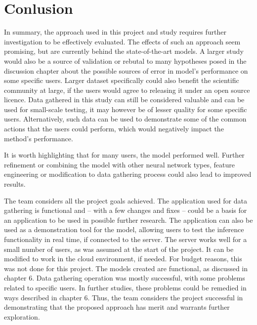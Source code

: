 
\chapter{Conlusion}

In summary, the approach used in this project and study requires further investigation to be effectively evaluated. The effects of such an approach seem promising, but are currently behind the state-of-the-art models. A larger study would also be a source of validation or rebutal to many hypotheses posed in the discussion chapter about the possible sources of error in model's performance on some specific users. Larger dataset specifically could also benefit the scientific community at large, if the users would agree to releasing it under an open source licence. Data gathered in this study can still be considered valuable and can be used for small-scale testing, it may however be of lesser quality for some specific users. Alternatively, such data can be used to demonstrate some of the common actions that the users could perform, which would negatively impact the method's performance.

It is worth highlighting that for many users, the model performed well. Further refinement or combining the model with other neural network types, feature engineering or modification to data gathering process could also lead to improved results.

The team considers all the project goals achieved. The application used for data gathering is functional and -- with a few changes and fixes -- could be a basis for an application to be used in possible further research. The application can also be used as a demonstration tool for the model, allowing users to test the inference functionality in real time, if connected to the server. The server works well for a small number of users, as was assumed at the start of the project. It can be modified to work in the cloud environment, if needed. For budget reasons, this was not done for this project. The models created are functional, as discussed in chapter 6. Data gathering operation was mostly successful, with some problems related to specific users. In further studies, these problems could be remedied in ways described in chapter 6. Thus, the team considers the project successful in demonstrating that the proposed approach has merit and warrants further exploration.